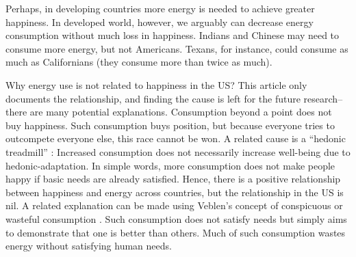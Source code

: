 \documentclass[10pt, letterpaper]{article}
\begin{document}
\begin{spacing}{1.4}
Perhaps, in developing countries more  energy
 is needed to achieve greater happiness. In developed world, however, we
 arguably can  decrease
energy consumption without much loss in happiness. %
Indians and Chinese may need to consume more energy, but not Americans. 
Texans, for instance,  could consume as much as Californians (they consume more than twice as
much). %

Why energy use is not related to happiness in the US? This article only
documents the relationship, and finding the cause is left for the future
research--there are many potential explanations.
Consumption beyond a point does not buy happiness. Such consumption buys
position, but because everyone tries to outcompete everyone else, this race
cannot be won. A related cause is a ``hedonic treadmill'' \cite{brickman78cj}: Increased consumption does not necessarily increase well-being due to hedonic-adaptation. In simple words, more consumption
does not  make people happy if basic needs are already satisfied. Hence, there is
a positive
relationship between happiness and energy across countries, but the relationship
in the US is nil. %
 A related explanation can be made using Veblen's concept of conspicuous or
 wasteful consumption \cite{veblen05a, veblen05b}. Such consumption does not
 satisfy needs but simply aims to demonstrate that
one is better than others. Much of such consumption wastes energy without
satisfying human needs. %


\end{spacing}
\end{document}
